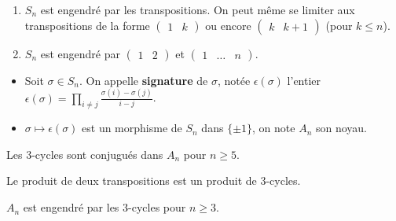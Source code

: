 
  \begin{proposition}
    \begin{enumerate}[label={\bfseries(\roman*)}]
      \item $S_n$ est engendré par les transpositions. On peut même se limiter aux transpositions de la forme $\begin{pmatrix} 1 & k \end{pmatrix}$ ou encore  $\begin{pmatrix} k & k+1 \end{pmatrix}$ (pour $k \leq n$).
      \item $S_n$ est engendré par $\begin{pmatrix} 1 & 2 \end{pmatrix}$ et $\begin{pmatrix} 1 & \dots & n \end{pmatrix}$.
    \end{enumerate}
  \end{proposition}


  \begin{definition}
    \begin{itemize}
      \item Soit $\sigma \in S_n$. On appelle \textbf{signature} de $\sigma$, notée $\epsilon(\sigma)$ l'entier $\epsilon(\sigma) = \prod_{i \neq j} \frac{\sigma(i) - \sigma(j)}{i-j}$.
      \item $\sigma \mapsto \epsilon(\sigma)$ est un morphisme de $S_n$ dans $\{ \pm 1 \}$, on note $A_n$ son noyau.
    \end{itemize}
  \end{definition}


  \begin{lemma}
    Les $3$-cycles sont conjugués dans $A_n$ pour $n \geq 5$.
  \end{lemma}


  \begin{lemma}
    Le produit de deux transpositions est un produit de $3$-cycles.
  \end{lemma}

  \begin{proposition}
    $A_n$ est engendré par les $3$-cycles pour $n \geq 3$.
  \end{proposition}

